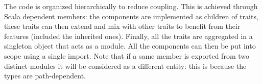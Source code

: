 The code is organized hierarchically to reduce coupling. This is achieved through Scala dependent members: the components are implemented as children of traits, these traits can then extend and mix with other traits to benefit from their features (included the inherited ones). Finally, all the traits are aggregated in a singleton object that acts as a module. All the components can then be put into scope using a single import. Note that if a same member is exported from two distinct modules it will be considered as a different entity: this is because the types are path-dependent.
